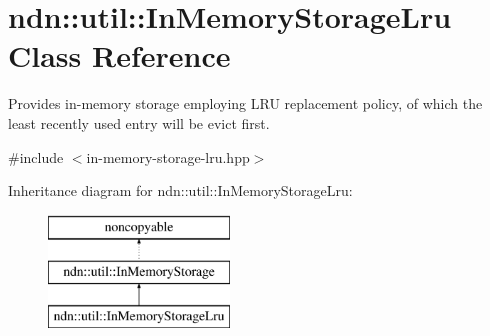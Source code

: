\hypertarget{classndn_1_1util_1_1InMemoryStorageLru}{}\section{ndn\+:\+:util\+:\+:In\+Memory\+Storage\+Lru Class Reference}
\label{classndn_1_1util_1_1InMemoryStorageLru}


Provides in-\/memory storage employing L\+RU replacement policy, of which the least recently used entry will be evict first.  




{\ttfamily \#include $<$in-\/memory-\/storage-\/lru.\+hpp$>$}

Inheritance diagram for ndn\+:\+:util\+:\+:In\+Memory\+Storage\+Lru\+:\begin{figure}[H]
\begin{center}
\leavevmode
\includegraphics[height=3.000000cm]{classndn_1_1util_1_1InMemoryStorageLru}
\end{center}
\end{figure}
